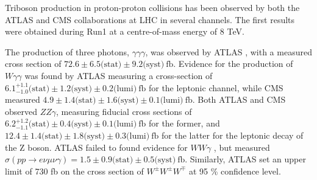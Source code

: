 Triboson production in proton-proton collisions has been observed by both the ATLAS and CMS collaborations at LHC in several channels.
The first results were obtained during Run1 at a centre-of-mass energy of 8 TeV.

The production of three photons, $\gamma\gamma\gamma$, was observed by ATLAS \cite{STDM-2016-06}, with a measured cross section of $72.6 \pm 6.5 \text{(stat)} \pm 9.2 \text{(syst)}~\text{fb}$.
Evidence for the production of $W\gamma\gamma$ was found by ATLAS \cite{STDM-2013-05} measuring a cross-section of $6.1^{+1.1}_{-1.0} \text{(stat)} \pm 1.2 \text{(syst)} \pm 0.2 \text{(lumi)}~\text{fb}$ for the leptonic channel,
while CMS \cite{SMP-15-008} measured $4.9 \pm 1.4 \text{(stat)} \pm 1.6 \text{(syst)} \pm 0.1 \text{(lumi)}~\text{fb}$.
Both ATLAS \cite{STDM-2014-01} and CMS \cite{SMP-15-008} observed $ZZ\gamma$, measuring fiducial cross sections of
$6.2^{+1.2}_{-1.1} \text{(stat)} \pm 0.4 \text{(syst)} \pm 0.1 \text{(lumi)}~\text{fb}$ for the former,
and $12.4 \pm 1.4 \text{(stat)} \pm 1.8 \text{(syst)} \pm 0.3 \text{(lumi)}~\text{fb}$ for the latter for the leptonic decay of the Z boson.
ATLAS failed to found evidence for $WW\gamma$ \cite{STDM-2016-05}, but measured $\sigma(pp \rightarrow e\nu \mu\nu \gamma) = 1.5 \pm 0.9 \text{(stat)} \pm 0.5 \text{(syst)}~\text{fb}$.
Similarly, ATLAS set an upper limit of 730 fb \cite{STDM-2015-07} on the cross section of $W^{\pm}W^{\pm}W^{\mp}$ at 95 \% confidence level.

